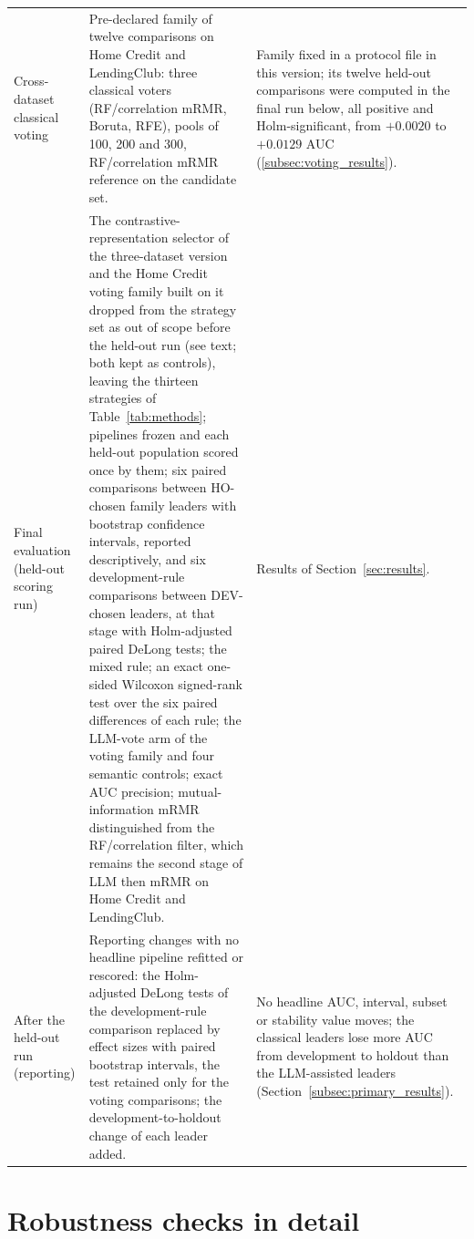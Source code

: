 \documentclass[final,5p,twocolumn]{elsarticle}
\begin{document}
\begin{table}[htbp]
\begin{threeparttable}
\begin{tabular}{@{}L{27mm}L{\dimexpr(\textwidth-27mm-4\tabcolsep)/2\relax}L{\dimexpr(\textwidth-27mm-4\tabcolsep)/2\relax}@{}}
\addlinespace
Cross-dataset classical voting & Pre-declared family of twelve comparisons on Home Credit and LendingClub: three classical voters (RF/correlation mRMR, Boruta, RFE), pools of 100, 200 and 300, RF/correlation mRMR reference on the candidate set. & Family fixed in a protocol file in this version; its twelve held-out comparisons were computed in the final run below, all positive and Holm-significant, from $+0.0020$ to $+0.0129$ AUC (\ref{subsec:voting_results}). \\
\addlinespace
Final evaluation (held-out scoring run) & The contrastive-representation selector of the three-dataset version and the Home Credit voting family built on it dropped from the strategy set as out of scope before the held-out run (see text; both kept as controls), leaving the thirteen strategies of Table~\ref{tab:methods}; pipelines frozen and each held-out population scored once by them; six paired comparisons between HO-chosen family leaders with bootstrap confidence intervals, reported descriptively, and six development-rule comparisons between DEV-chosen leaders, at that stage with Holm-adjusted paired DeLong tests; the mixed rule; an exact one-sided Wilcoxon signed-rank test over the six paired differences of each rule; the LLM-vote arm of the voting family and four semantic controls; exact AUC precision; mutual-information mRMR distinguished from the RF/correlation filter, which remains the second stage of LLM then mRMR on Home Credit and LendingClub. & Results of Section~\ref{sec:results}. \\
\addlinespace
After the held-out run (reporting) & Reporting changes with no headline pipeline refitted or rescored: the Holm-adjusted DeLong tests of the development-rule comparison replaced by effect sizes with paired bootstrap intervals, the test retained only for the voting comparisons; the development-to-holdout change of each leader added. & No headline AUC, interval, subset or stability value moves; the classical leaders lose more AUC from development to holdout than the LLM-assisted leaders (Section~\ref{subsec:primary_results}). \\
\bottomrule
\end{tabular}
\end{threeparttable}
\end{table}

\section{Robustness checks in detail}
\label{app:robustness}
\setcounter{table}{0}\setcounter{figure}{0}
\end{document}
